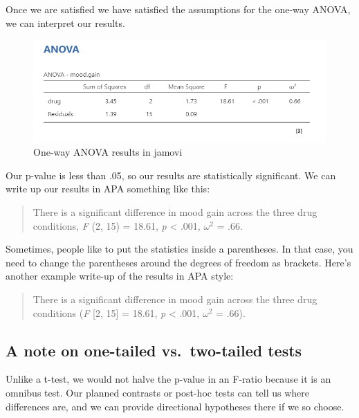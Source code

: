 \documentclass[
]{book}
\begin{document}
Once we are satisfied we have satisfied the assumptions for the one-way ANOVA, we can interpret our results.

\begin{figure}

{\centering \includegraphics[width=1\linewidth]{images/04_one-way-anova/one-way_results} 

}

\caption{One-way ANOVA results in jamovi}\label{fig:unnamed-chunk-6}
\end{figure}

Our p-value is less than .05, so our results are statistically significant. We can write up our results in APA something like this:

\begin{quote}
There is a significant difference in mood gain across the three drug conditions, \emph{F} (2, 15) = 18.61, \emph{p} \textless{} .001, \(\omega^2\) = .66.
\end{quote}

Sometimes, people like to put the statistics inside a parentheses. In that case, you need to change the parentheses around the degrees of freedom as brackets. Here's another example write-up of the results in APA style:

\begin{quote}
There is a significant difference in mood gain across the three drug conditions (\emph{F} {[}2, 15{]} = 18.61, \emph{p} \textless{} .001, \(\omega^2\) = .66).
\end{quote}

\hypertarget{a-note-on-one-tailed-vs.-two-tailed-tests}{%
\subsection{A note on one-tailed vs.~two-tailed tests}\label{a-note-on-one-tailed-vs.-two-tailed-tests}}

Unlike a t-test, we would not halve the p-value in an F-ratio because it is an omnibus test. Our planned contrasts or post-hoc tests can tell us where differences are, and we can provide directional hypotheses there if we so choose.
\end{document}
